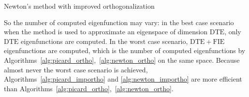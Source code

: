 \documentclass[smallextended]{svjour3}
\begin{document}
\begin{algorithm}[!ht] \caption{Newton's method with improved orthogonalization} \label{alg:newton_importho} 
\begin{algorithmic}

\REPEAT
{}
    \ENDFOR
    \ENDIF
\ENDIF



\end{algorithmic}
\end{algorithm}

So the number of computed eigenfunction may vary: in the best case scenario when the method is used to approximate an eigenspace of dimension $\mathrm{DTE}$, only $\mathrm{DTE}$ eigenfunctions are computed. In the worst case scenario, $\mathrm{DTE}+\mathrm{FIE}$ eigenfunctions are computed, which is the number of computed eigenfunctions by Algorithms~\ref{alg:picard_ortho},~\ref{alg:newton_ortho} on the same space. Because almost never the worst case scenario is achieved, Algorithms~\ref{alg:picard_importho} and \ref{alg:newton_importho} are more efficient than Algorithms~\ref{alg:picard_ortho},~\ref{alg:newton_ortho}.
\end{document}
